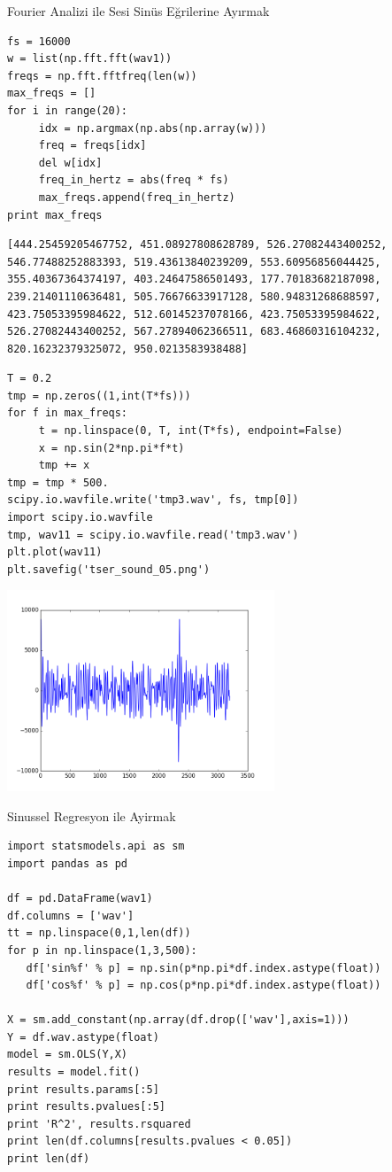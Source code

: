 \documentclass[12pt,fleqn]{article}\usepackage{../../common}
\begin{document}
Fourier Analizi ile Sesi Sinüs Eğrilerine Ayırmak

\begin{verbatim}
fs = 16000
w = list(np.fft.fft(wav1))
freqs = np.fft.fftfreq(len(w))
max_freqs = []
for i in range(20):
     idx = np.argmax(np.abs(np.array(w)))
     freq = freqs[idx]
     del w[idx]
     freq_in_hertz = abs(freq * fs)
     max_freqs.append(freq_in_hertz)
print max_freqs
\end{verbatim}

\begin{verbatim}
[444.25459205467752, 451.08927808628789, 526.27082443400252, 546.77488252883393, 519.43613840239209, 553.60956856044425, 355.40367364374197, 403.24647586501493, 177.70183682187098, 239.21401110636481, 505.76676633917128, 580.94831268688597, 423.75053395984622, 512.60145237078166, 423.75053395984622, 526.27082443400252, 567.27894062366511, 683.46860316104232, 820.16232379325072, 950.0213583938488]
\end{verbatim}


\begin{verbatim}
T = 0.2
tmp = np.zeros((1,int(T*fs)))
for f in max_freqs: 
     t = np.linspace(0, T, int(T*fs), endpoint=False) 
     x = np.sin(2*np.pi*f*t)
     tmp += x
tmp = tmp * 500.
scipy.io.wavfile.write('tmp3.wav', fs, tmp[0])
import scipy.io.wavfile
tmp, wav11 = scipy.io.wavfile.read('tmp3.wav')
plt.plot(wav11)
plt.savefig('tser_sound_05.png')
\end{verbatim}

\includegraphics[height=6cm]{tser_sound_05.png}

Sinussel Regresyon ile Ayirmak

\begin{verbatim}
import statsmodels.api as sm
import pandas as pd

df = pd.DataFrame(wav1)
df.columns = ['wav']
tt = np.linspace(0,1,len(df))
for p in np.linspace(1,3,500):
   df['sin%f' % p] = np.sin(p*np.pi*df.index.astype(float))
   df['cos%f' % p] = np.cos(p*np.pi*df.index.astype(float))

X = sm.add_constant(np.array(df.drop(['wav'],axis=1)))
Y = df.wav.astype(float)
model = sm.OLS(Y,X)
results = model.fit()
print results.params[:5]
print results.pvalues[:5]
print 'R^2', results.rsquared
print len(df.columns[results.pvalues < 0.05])
print len(df)
\end{verbatim}
\end{document}
